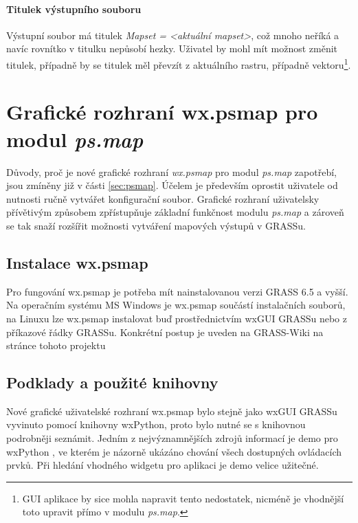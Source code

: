 \documentclass[a4paper,12pt,draft]{article}
\newcommand{\modul}[1]{\emph{#1}}
\begin{document}
\paragraph*{Titulek výstupního souboru}
Výstupní soubor má titulek \emph{Mapset = \textless aktuální
mapset\textgreater}, což mnoho neříká a navíc rovnítko v titulku
nepůsobí hezky. Uživatel by mohl mít možnost změnit titulek,
případně by se titulek měl převzít z aktuálního rastru, případně
vektoru\footnote{GUI aplikace by sice mohla napravit tento nedostatek,
nicméně je vhodnější toto upravit přímo v modulu \modul{ps.map}.}.



\section{Grafické rozhraní  wx.psmap pro modul \modul{ps.map}}
\label{sec:gui}

Důvody, proč je nové grafické rozhraní \emph{wx.psmap} pro
modul \modul{ps.map} zapotřebí, jsou zmíněny již v části
\ref{sec:psmap}. Účelem je především oprostit uživatele od nutnosti
ručně vytvářet konfigurační soubor. Grafické rozhraní uživatelsky
přívětivým způsobem zpřístupňuje základní funkčnost modulu
\modul{ps.map} a zároveň se tak snaží rozšířit možnosti vytváření
mapových výstupů v GRASSu.

\subsection{Instalace wx.psmap}
Pro fungování wx.psmap je potřeba mít nainstalovanou verzi
GRASS 6.5 a vyšší. Na operačním systému MS Windows je wx.psmap
součástí instalačních souborů, na Linuxu lze wx.psmap instalovat buď
prostřednictvím wxGUI GRASSu nebo z příkazové řádky GRASSu. Konkrétní
postup je uveden na GRASS-Wiki na stránce tohoto projektu \cite{wiki_wxpsmap}
\subsection{Podklady a použité knihovny}
Nové grafické uživatelské rozhraní wx.psmap bylo stejně jako wxGUI
GRASSu vyvinuto pomocí knihovny wxPython,
proto bylo nutné se s knihovnou podrobněji seznámit. Jedním z
nejvýznamnějších zdrojů informací je demo pro wxPython \cite{demo},
ve kterém je názorně ukázáno chování všech dostupných ovládacích
prvků. Při
hledání vhodného widgetu pro aplikaci je demo velice užitečné.
\end{document}
